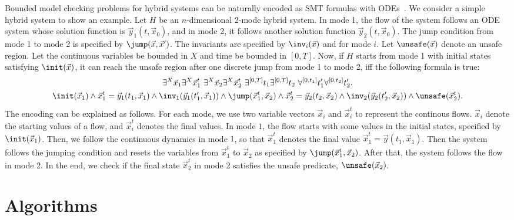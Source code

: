 \documentclass[11pt]{article}
\begin{document}
 Bounded model checking problems for hybrid systems can be naturally encoded as SMT formulas with ODEs~\cite{Eggers2008,Eggers2011,DBLP:journals/sttt/IshiiUH11,DBLP:conf/fmcad/CimattiMT12,DBLP:conf/aaai/CimattiMT12}. We consider a simple hybrid system to show an example. Let $H$ be an $n$-dimensional 2-mode hybrid system. In mode 1, the flow of the system follows an ODE system whose solution function is $\vec y_1(t, \vec x_0)$, and in mode 2, it follows another solution function $\vec y_2(t, \vec x_0)$. The jump condition from mode 1 to mode 2 is specified by $\jump(\vec x, \vec x')$. The invariants are specified by $\inv_i(\vec x)$ and for mode $i$. Let $\unsafe(\vec x)$ denote an unsafe region. Let the continuous variables be bounded in $X$ and time be bounded in $[0,T]$. Now, if $H$ starts from mode 1 with initial states satisfying $\init(\vec x)$, it can reach the unsafe region after one discrete jump from mode 1 to mode 2, iff the following formula is true:
{\small
\begin{multline*}
\exists^X \vec x_1 \exists^X \vec x_1^t\ \exists^X \vec x_2\exists^X \vec x_2^t\ \exists^{[0,T]}t_1\exists^{[0,T]}t_2\ \forall^{[0,t_1]}t_1'\forall^{[0,t_2]}t_2'.\\
\init(\vec x_1)\wedge\vec x_1^t = \vec y_1(t_1,\vec x_1)\wedge \inv_1(\vec y_1(t_1', \vec x_1))\wedge \jump(\vec x_1^t, \vec x_2)\wedge \vec x_2^t = \vec y_2(t_2, \vec x_2)\wedge \inv_2(\vec y_2(t_2', \vec x_2))\wedge \unsafe(\vec x_2^t).
\end{multline*}
}The encoding can be explained as follows. For each mode, we use two variable vectors $\vec x_i$ and $\vec x_i^t$ to represent the continous flows. $\vec x_i$ denote the starting values of a flow, and $\vec x_i^t$ denotes the final values. In mode $1$, the flow starts with some values in the initial states, specified by $\init(\vec x_1)$. Then, we follow the continuous dynamics in mode $1$, so that $\vec x_1^t$ denotes the final value $\vec x_1^t = \vec y(t_1, \vec x_1)$. Then the system follows the jumping condition and resets the variables from $\vec x_1^t$ to $\vec x_2$ as specified by $\jump(\vec x_1^t, \vec x_2)$. After that, the system follows the flow in mode 2. In the end, we check if the final state $\vec x_2^t$ in mode 2 satisfies the unsafe predicate, $\unsafe(\vec x_2)$. 

\section{Algorithms}\label{algorithms}
\end{document}
